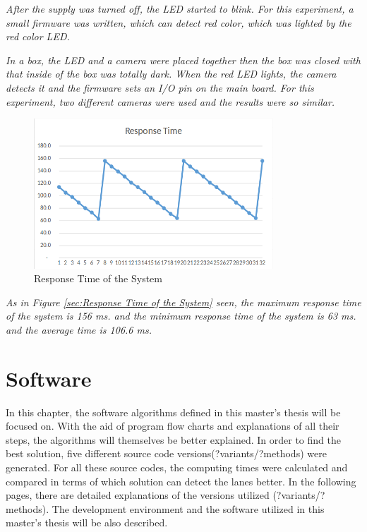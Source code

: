\emph{\color{blue}After the supply was turned off, the LED started to blink. For this experiment, a small firmware was written, which can detect red color, which was lighted by the red color LED.}

\emph{\color{blue}In a box, the LED and a camera were placed together then the box was closed with that inside of the box was totally dark. When the red LED lights, the camera detects it and the firmware sets an I/O pin on the main board. For this experiment, two different cameras were used and the results were so similar.}


\begin{figure}[H]
 \centering
  \includegraphics[width=0.8\textwidth]{./Bilder/Response_Time2.png}		 \caption{Response Time of the System}
  \label{fig:Response_Time_of_the_System}
\end{figure}


\emph{\color{blue}As in Figure \ref{sec:Response Time of the System} seen, the maximum response time of the system is 156 ms. and the minimum response time of the system is 63 ms. and the average time is 106.6 ms.}







%
\section{Software}\label{sec:Software}


In this chapter, the software algorithms defined in this master's thesis will be focused on. With the aid of program flow charts and explanations of all their steps, the algorithms will themselves be better explained. In order to find the best solution, five different source code versions(?variants/?methods) were generated. For all these source codes, the computing times were calculated and compared in terms of which solution can detect the lanes better. In the following pages, there are detailed explanations of the versions utilized (?variants/?methods). The development environment and the software utilized in this master's thesis will be also described.

